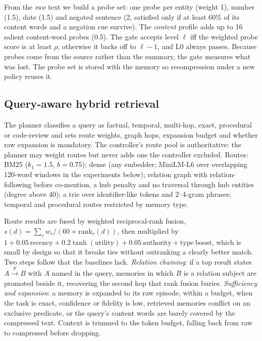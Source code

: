 \documentclass[conference]{IEEEtran}
\begin{document}
From the \emph{raw} text we build a probe set: one probe per entity (weight 1), number (1.5), date (1.5) and negated sentence (2, satisfied only if at least 60\% of its content words and a negation cue survive). The \emph{content} profile adds up to 16 salient content-word probes (0.5). The gate accepts level $\ell$ iff the weighted probe score is at least $\rho$; otherwise it backs off to $\ell-1$, and L0 always passes. Because probes come from the source rather than the summary, the gate measures what was lost. The probe set is stored with the memory so recompression under a new policy reuses it.

\subsection{Query-aware hybrid retrieval}
\label{sec:retrieval}
The planner classifies a query as factual, temporal, multi-hop, exact, procedural or code-review and sets route weights, graph hops, expansion budget and whether raw expansion is mandatory. The controller's route pool is authoritative: the planner may weight routes but never adds one the controller excluded. Routes: BM25 ($k_1 = 1.5$, $b = 0.75$); dense (any embedder; MiniLM-L6 over overlapping 120-word windows in the experiments below); relation graph with relation-following before co-mention, a hub penalty and no traversal through hub entities (degree above 40); a trie over identifier-like tokens and 2--4-gram phrases; temporal and procedural routes restricted by memory type.

Route results are fused by weighted reciprocal-rank fusion, $s(d) = \sum_r w_r/(60 + \mathrm{rank}_r(d))$, then multiplied by $1 + 0.05\,\mathrm{recency} + 0.2\tanh(\mathrm{utility}) + 0.05\,\mathrm{authority} + \mathrm{type\ boost}$, which is small by design so that it breaks ties without outranking a clearly better match. Two steps follow that the baselines lack. \emph{Relation chaining}: if a top result states $A \xrightarrow{p} B$ with $A$ named in the query, memories in which $B$ is a relation subject are promoted beside it, recovering the second hop that rank fusion buries. \emph{Sufficiency and expansion}: a memory is expanded to its raw episode, within a budget, when the task is exact, confidence or fidelity is low, retrieved memories conflict on an exclusive predicate, or the query's content words are barely covered by the compressed text. Context is trimmed to the token budget, falling back from raw to compressed before dropping.
\end{document}
